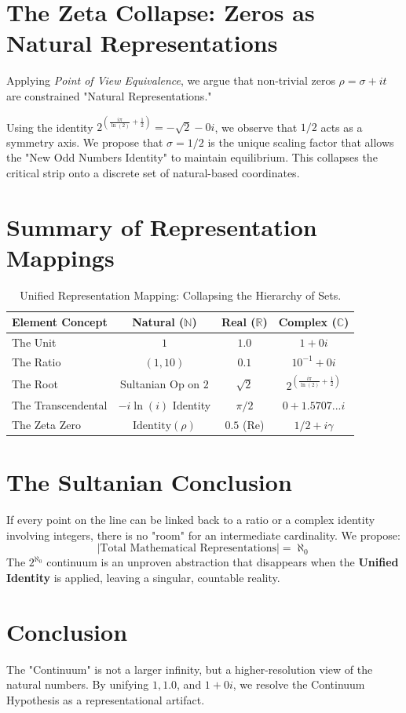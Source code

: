 \documentclass[12pt,a4paper]{article}
\begin{document}
\section{The Zeta Collapse: Zeros as Natural Representations}
Applying \textit{Point of View Equivalence}, we argue that non-trivial zeros $\rho = \sigma + it$ are constrained "Natural Representations." 

Using the identity $2^{\left(\frac{i \pi}{\ln(2)} + \frac{1}{2}\right)} = -\sqrt{2}-0i$, we observe that $1/2$ acts as a symmetry axis. We propose that $\sigma = 1/2$ is the unique scaling factor that allows the "New Odd Numbers Identity" to maintain equilibrium. This collapses the critical strip onto a discrete set of natural-based coordinates.

\section{Summary of Representation Mappings}
\begin{table}[htbp]
\centering
\begin{tabular}{|l|c|c|c|}
\hline
\textbf{Element Concept} & \textbf{Natural ($\mathbb{N}$)} & \textbf{Real ($\mathbb{R}$)} & \textbf{Complex ($\mathbb{C}$)} \\ \hline
The Unit & $1$ & $1.0$ & $1 + 0i$ \\ \hline
The Ratio & $(1, 10)$ & $0.1$ & $10^{-1} + 0i$ \\ \hline
The Root & Sultanian Op on $2$ & $\sqrt{2}$ & $2^{(\frac{i\pi}{\ln(2)} + \frac{1}{2})}$ \\ \hline
The Transcendental & $-i \ln(i)$ Identity & $\pi/2$ & $0 + 1.5707...i$ \\ \hline
The Zeta Zero & $\text{Identity}(\rho)$ & $0.5$ (Re) & $1/2 + i\gamma$ \\ \hline
\end{tabular}
\caption{Unified Representation Mapping: Collapsing the Hierarchy of Sets.}
\end{table}

\section{The Sultanian Conclusion}
If every point on the line can be linked back to a ratio or a complex identity involving integers, there is no "room" for an intermediate cardinality. We propose:
\begin{equation}
    |\text{Total Mathematical Representations}| = \aleph_0
\end{equation}
The $2^{\aleph_0}$ continuum is an unproven abstraction that disappears when the \textbf{Unified Identity} is applied, leaving a singular, countable reality.

\section{Conclusion}
The "Continuum" is not a larger infinity, but a higher-resolution view of the natural numbers. By unifying $1, 1.0$, and $1+0i$, we resolve the Continuum Hypothesis as a representational artifact.
\end{document}
